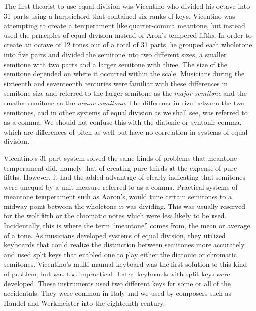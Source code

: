 The first theorist to use equal division was Vicentino who divided his octave into 31
parts using a harpsichord that contained six ranks of keys. Vicentino was attempting to
create a temperament like quarter-comma meantone, but instead used the principles of equal
division instead of Aron's tempered fifths. In order to create an octave of 12 tones out
of a total of 31 parts, he grouped each wholetone into five parts and divided the semitone
into two different sizes, a smaller semitone with two parts and a larger semitone with
three.  The size of the semitone depended on where it occurred within the scale.
Musicians during the sixteenth and seventeenth centuries were familiar with these
differences in semitone size and referred to the larger semitone as the \textit{major
semitone} and the smaller semitone as the \textit{minor semitone}.  The difference in size
between the two semitones, and in other systems of equal division as we shall see, was
referred to as a comma.  We should not confuse this with the diatonic or syntonic comma,
which are differences of pitch as well but have no correlation in systems of equal
division.

Vicentino's 31-part system solved the same kinds of problems that meantone temperament
did, namely that of creating pure thirds at the expense of pure fifths. However, it had
the added advantage of clearly indicating that semitones were unequal by a unit measure
referred to as a comma.  Practical systems of meantone temperament such as Aaron's, would
tune certain semitones to a midway point between the wholetone it was dividing.  This was
usually reserved for the wolf fifth or the chromatic notes which were less likely to be
used.  Incidentally, this is where the term ``meantone'' comes from, the mean or average
of a tone.  As musicians developed systems of equal division, they utilized keyboards that
could realize the distinction between semitones more accurately and used split keys that
enabled one to play either the diatonic or chromatic semitones.  Vicentino's multi-manual
keyboard was the first solution to this kind of problem, but was too impractical.  Later,
keyboards with split keys were developed.  These instruments used two different keys for
some or all of the accidentals.  They were common in Italy and we used by composers such
as Handel and Werkmeister into the eighteenth century. \autocite[108]{MB:1}

